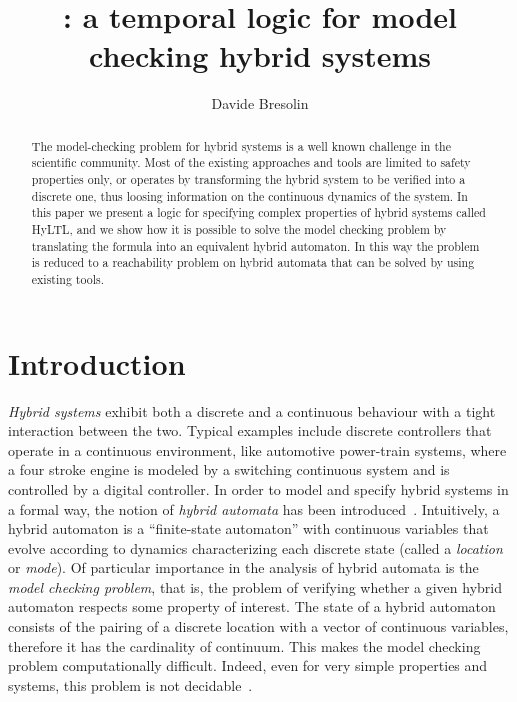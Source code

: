 \documentclass[submission,copyright,creativecommons]{eptcs}
\title{\hyltl: a temporal logic for model checking hybrid systems}
\author{Davide Bresolin
\institute{Universit\`{a} degli Studi di Verona \\ Dipartimento di Informatica \\ Verona, Italy}
\email{davide.bresolin@univr.it}
}
\newcommand{\hyltl}{\textsf{HyLTL}\xspace}
\begin{document}
\maketitle

\begin{abstract}
The model-checking problem for hybrid systems is a well known challenge in the scientific community. Most of the existing approaches and tools are limited to safety properties only, or operates by transforming the hybrid system to be verified into a discrete one, thus loosing information on the continuous dynamics of the system.
In this paper we present a logic for specifying complex properties of hybrid systems called \hyltl, and we show how it is possible to solve the model checking problem by translating the formula into an equivalent hybrid automaton. In this way the problem is reduced to a reachability problem on hybrid automata that can be solved by using existing tools.
\end{abstract}

\section{Introduction}

\emph{Hybrid systems} exhibit both a discrete and a continuous behaviour with a tight interaction between the two. Typical examples include discrete controllers that operate in a continuous environment, like automotive power-train systems, where a four stroke engine is modeled by a switching continuous system and is controlled by a digital controller.
In order to model and specify hybrid systems in a formal way, the notion of \emph{hybrid automata} has been introduced~\cite{Alur,Hen00a,maler91from}. Intuitively, a hybrid automaton is a ``finite-state automaton'' with continuous variables that evolve according to dynamics characterizing each discrete state (called a {\em location} or {\em mode}). 
Of particular importance in the analysis of hybrid automata is the \emph{model checking problem}, that is, the problem of verifying whether a given hybrid automaton respects some property of interest. 
The state of a hybrid automaton consists of the pairing of a discrete location with a vector of continuous variables, therefore it has the cardinality of continuum. 
This makes the model checking problem computationally difficult. Indeed, even for very simple properties and systems, this problem is not decidable~\cite{henzinger98whats}.
\end{document}
